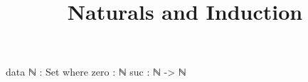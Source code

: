 \documentclass{lecturenotes}
\title{Naturals and Induction}
\begin{document}
\maketitle

\begin{code}
  data ℕ : Set where
    zero : ℕ
    suc : ℕ -> ℕ
\end{code}
\end{document}
